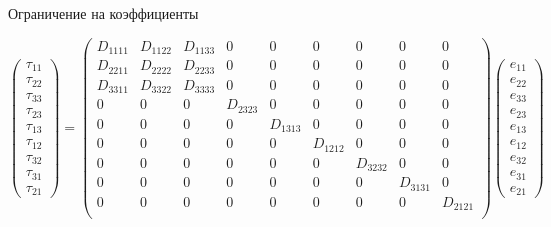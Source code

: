 \documentclass{beamer}
\begin{document}
{\begin{exampleblock}{Ограничение на коэффициенты}
{		\hspace{-0.7cm}
		\parbox{\textwidth}{
		\scriptsize
		\[
		\begin{pmatrix}
		\tau_{11} \\
		\tau_{22}\\
		\tau_{33} \\
		\tau_{23} \\
		\tau_{13} \\
		\tau_{12} \\
		\tau_{32} \\
		\tau_{31} \\
		\tau_{21} 
		\end{pmatrix}
		=
		\begin{pmatrix}
		D_{1111} & D_{1122}  & D_{1133} & 0 & 0 & 0 &0 & 0& 0\\
		D_{2211} & D_{2222}  & D_{2233} & 0 &0 & 0 & 0 & 0& 0\\
		D_{3311} & D_{3322}  & D_{3333} & 0 & 0 & 0 & 0 &0& 0\\
		0 & 0  & 0 & D_{2323} & 0 & 0 & 0 & 0 & 0\\
		0 & 0  & 0 & 0 & D_{1313} & 0 & 0 & 0 & 0\\
		0 & 0  & 0 & 0 & 0 & D_{1212} & 0 & 0 & 0\\
		0 & 0  & 0 & 0 & 0 & 0 & D_{3232} & 0 & 0\\
		0 & 0  & 0 & 0 & 0 & 0 & 0 & D_{3131} & 0\\
		0 & 0 & 0 & 0 & 0 & 0 & 0 & 0 & D_{2121}\\	
		\end{pmatrix}
		\begin{pmatrix}
		e_{11} \\
		e_{22}\\
		e_{33} \\
		e_{23} \\
		e_{13} \\
		e_{12} \\
		e_{32} \\
		e_{31} \\
		e_{21} 
		\end{pmatrix}
		\]
		}
				
		}
		
	\end{exampleblock}

}
\end{document}
